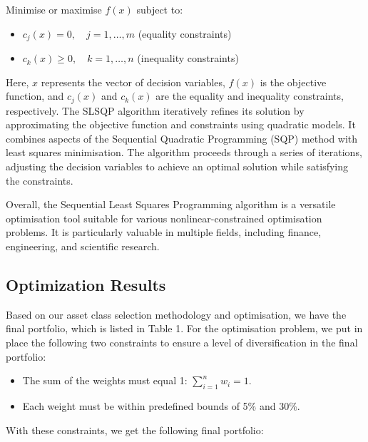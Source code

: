 \documentclass{article}
\begin{document}
Minimise or maximise \( f(x) \) subject to:
\begin{itemize}
    \item \( c_j(x) = 0, \quad j = 1, \ldots, m \) (equality constraints)
    \item \( c_k(x) \geq 0, \quad k = 1, \ldots, n \) (inequality constraints)
\end{itemize}

Here, \( x \) represents the vector of decision variables, \( f(x) \) is the objective function, and \( c_j(x) \) and \( c_k(x) \) are the equality and inequality constraints, respectively.
The SLSQP algorithm iteratively refines its solution by approximating the objective function and constraints using quadratic models. It combines aspects of the Sequential Quadratic Programming (SQP) method with least squares minimisation. The algorithm proceeds through a series of iterations, adjusting the decision variables to achieve an optimal solution while satisfying the constraints.

Overall, the Sequential Least Squares Programming algorithm is a versatile optimisation tool suitable for various nonlinear-constrained optimisation problems. It is particularly valuable in multiple fields, including finance, engineering, and scientific research.

\subsection{Optimization Results}

Based on our asset class selection methodology and optimisation, we have the final portfolio, which is listed in Table 1. For the optimisation problem, we put in place the following two constraints to ensure a level of diversification in the final portfolio:

\begin{itemize}
    \item The sum of the weights must equal 1: \( \sum_{i=1}^{n} w_i = 1 \).
    \item Each weight must be within predefined bounds of 5\% and 30\%.
\end{itemize}

With these constraints, we get the following final portfolio:
\end{document}
